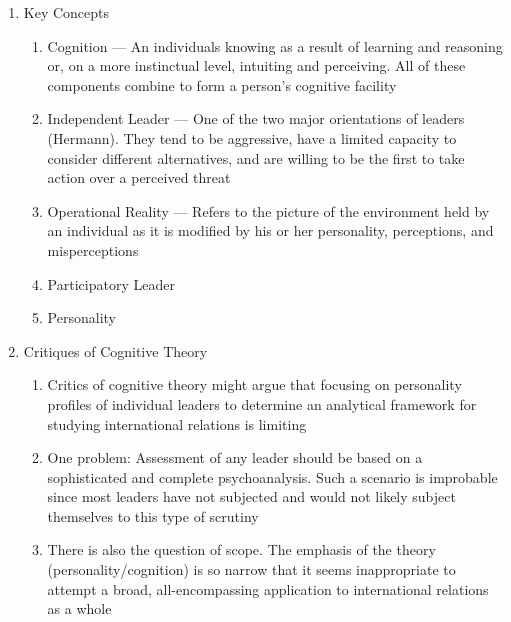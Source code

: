 \documentclass[12pt]{article}
\begin{document}
\begin{enumerate}
\begin{enumerate}
        \end{enumerate}

      \item Key Concepts

        \begin{enumerate}

          \item Cognition — An individuals knowing as a result of learning and reasoning or, on a more instinctual level, intuiting and perceiving. All of these components combine to form a person's cognitive facility

          \item Independent Leader — One of the two major orientations of leaders (Hermann).  They tend to be aggressive, have a limited capacity to consider different alternatives, and are willing to be the first to take action over a perceived threat

          \item Operational Reality — Refers to the picture of the environment held by an individual as it is modified by his or her personality, perceptions, and misperceptions

          \item Participatory Leader

          \item Personality

        \end{enumerate}

      \item Critiques of Cognitive Theory 

        \begin{enumerate}

          \item Critics of cognitive theory might argue that focusing on personality profiles of individual leaders to determine an analytical framework for studying international relations is limiting

          \item One problem: Assessment of any leader should be based on a sophisticated and complete psychoanalysis. Such a scenario is improbable since most leaders have not subjected and would not likely subject themselves to this type of scrutiny 

          \item There is also the question of scope. The emphasis of the theory (personality/cognition) is so narrow that it seems inappropriate to attempt a broad, all-encompassing application to international relations as a whole


\end{enumerate}
\end{enumerate}
\end{document}
